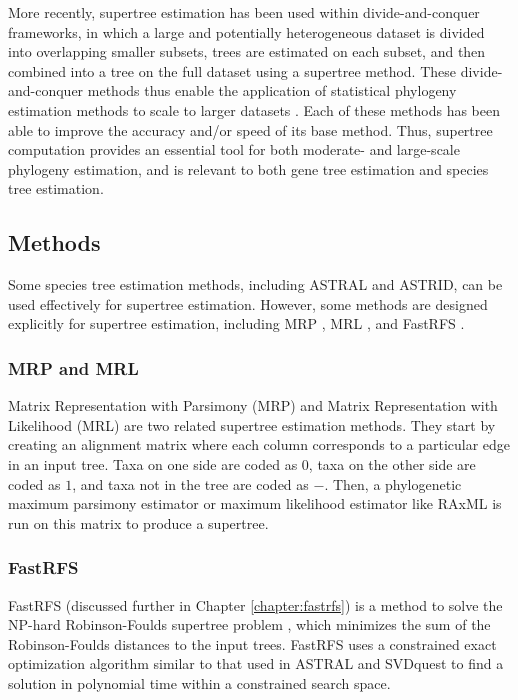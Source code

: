 \documentclass[tocnosub,noragright,centerchapter,fullpagesingle,12pt]{uiuc_csthesis18}
\begin{document}
More recently, supertree estimation has been used within divide-and-conquer frameworks, in which a large and potentially heterogeneous dataset is divided into overlapping smaller subsets, trees are estimated on each subset, and then combined into a tree on the full dataset using a supertree method. 
These divide-and-conquer methods thus enable the application of  statistical phylogeny estimation methods to scale to larger datasets
\cite{dactal,BayzidRECOMBCG2014,afc,dcm1-huson}.
Each of these methods has been able to improve the accuracy and/or speed of its base method.  
Thus, supertree computation provides an essential tool for both moderate- and large-scale phylogeny estimation, and is relevant to both gene tree estimation and species tree estimation. 

\subsection{Methods}

Some species tree estimation methods, including ASTRAL and ASTRID, can be used effectively for supertree estimation. However, some methods are designed explicitly for supertree estimation, including MRP \cite{ragan1992phylogenetic}, MRL \cite{nguyen2012mrl}, and FastRFS \cite{vachaspati2017fastrfs}. 

\subsubsection{MRP and MRL}

Matrix Representation with Parsimony (MRP) \cite{ragan1992phylogenetic} and Matrix Representation with Likelihood (MRL) \cite{nguyen2012mrl} are two related supertree estimation methods. They start by creating an alignment matrix where each column corresponds to a particular edge in an input tree. Taxa on one side are coded as $0$, taxa on the other side are coded as $1$, and taxa not in the tree are coded as $-$. Then, a phylogenetic maximum parsimony estimator or maximum likelihood estimator like RAxML is run on this matrix to produce a supertree.

\subsubsection{FastRFS}

FastRFS (discussed further in Chapter \ref{chapter:fastrfs}) is a method to solve the NP-hard Robinson-Foulds supertree problem \cite{bansal2010robinson}, which minimizes the sum of the Robinson-Foulds distances to the input trees. FastRFS uses a constrained exact optimization algorithm similar to that used in ASTRAL and SVDquest to find a solution in polynomial time within a constrained search space. 
\end{document}
